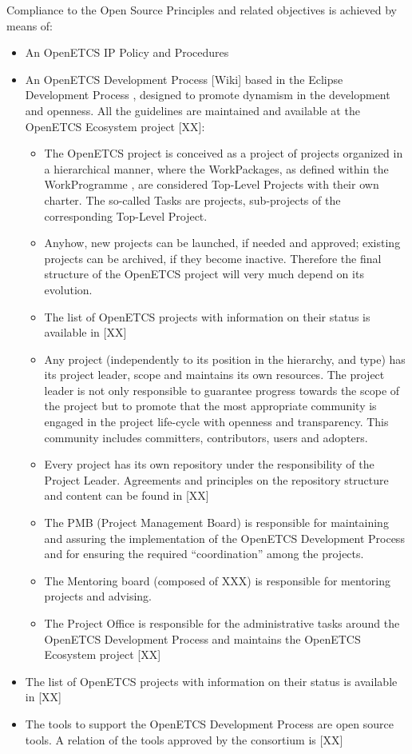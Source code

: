 \documentclass{template/openetcs_article}
\begin{document}
Compliance to the Open Source Principles and related objectives is achieved by means of:
\begin{itemize}
\item An OpenETCS IP Policy and Procedures \citep{IPP}
\item An OpenETCS Development Process \citep{odp}[Wiki] based in the Eclipse Development Process \citep{EDP}, designed to promote dynamism in the development and openness. All the guidelines are maintained and available at the OpenETCS Ecosystem project [XX]: 
\begin{itemize}
\item The OpenETCS project is conceived as a project of projects organized in a hierarchical manner, where the WorkPackages, as defined within the WorkProgramme \citep{fpp}, are considered Top-Level Projects with their own charter. The so-called Tasks are projects, sub-projects of the corresponding Top-Level Project.
\item Anyhow, new projects can be launched, if needed and approved; existing projects can be archived, if they become inactive. Therefore the final structure of the OpenETCS project will very much depend on its evolution.  
\item The list of OpenETCS projects with information on their status is available in [XX]
\item Any project (independently to its position in the hierarchy, and type) has its project leader, scope and maintains its own resources. The project leader is not only responsible to guarantee progress towards the scope of the project but to promote that the most appropriate community is engaged in the project life-cycle with openness and transparency. This community includes committers, contributors, users and adopters.
\item Every project has its own repository under the responsibility of the Project Leader. Agreements and principles on the repository structure and content can be found in [XX] 
\item The PMB (Project Management Board) is responsible for maintaining and assuring the implementation of the OpenETCS Development Process and for ensuring the required “coordination” among the projects.
\item The Mentoring board (composed of XXX) is responsible for mentoring projects and advising.
\item The Project Office is responsible for the administrative tasks around the OpenETCS Development Process and maintains the OpenETCS Ecosystem project [XX]
\end{itemize}
\item The list of OpenETCS projects with information on their status is available in [XX]
\item The tools to support the OpenETCS Development Process are open source tools. A relation of the tools approved by the consortium is [XX]
\end{itemize}
\end{document}
